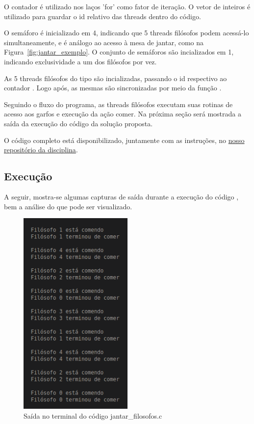 \documentclass[
	12pt,				%
	openright,			%
	oneside,			%
	a4paper,			%
	chapter=TITLE,		%
	english,			%
	french,				%
	spanish,			%
	brazil				%
	]{abntex2}
\theoremstyle{definition}
\begin{document}
O contador  é utilizado nos laços 'for' como fator de iteração. O vetor de inteiros  é utilizado para guardar o id relativo das threads dentro do código.

O semáforo  é inicializado em 4, indicando que 5 threads filósofos podem acessá-lo simultaneamente, e é análogo ao acesso à mesa de jantar, como na Figura~\ref{fig:jantar_exemplo}. O conjunto de semáforos  são incializados em 1, indicando exclusividade a um dos filósofos por vez.

As 5 threads filósofos  do tipo  são incializadas, passando o id respectivo ao contador . Logo após, as mesmas são sincronizadas por meio da função . 

Seguindo o fluxo do programa, as threads filósofos executam suas rotinas de acesso aos garfos e execução da ação comer. Na próxima seção será mostrada a saída da execução do código da solução proposta.

O código completo está disponibilizado, juntamente com as instruções, no \href{https://github.com/jvictorferreira3301/Sistemas_Operacionais}{nosso repositório da disciplina}.

\newpage
\subsection{Execução}
A seguir, mostra-se algumas capturas de saída durante a execução do código , bem a análise do que pode ser visualizado.

\begin{figure}[h]
    \centering
    \includegraphics[width=0.5\textwidth]{imagens/out_jantar_filosofos.png}
    \caption{Saída no terminal do código jantar\_filosofos.c}
    \label{fig:out_jantar_filosofos}
\end{figure}
\end{document}
